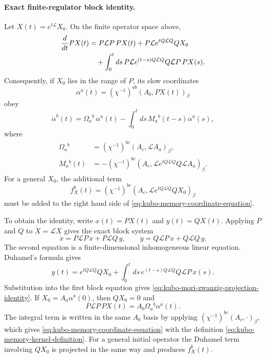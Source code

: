 \paragraph{Exact finite-regulator block identity.}
Let \(X(t)=e^{t\mathcal L}X_0\).  On the finite operator space above,
\begin{align}
  \frac{d}{dt}PX(t)
  &=
  P\mathcal LP\,PX(t)
  +P\mathcal L e^{tQ\mathcal LQ}QX_0
  \notag\\
  &\quad
  +\int_0^t ds\,
  P\mathcal L e^{(t-s)Q\mathcal LQ}
  Q\mathcal LP\,PX(s).
  \label{eq:kubo-mori-zwanzig-projection-identity}
\end{align}
Consequently, if \(X_0\) lies in the range of \(P\), its slow coordinates
\[
  \alpha^a(t)=(\chi^{-1})^{ab}(A_b,PX(t))_\beta
\]
obey
\begin{equation}
  \dot\alpha^b(t)
  =
  \Omega_a{}^b\,\alpha^a(t)
  -\int_0^t ds\,M_a{}^b(t-s)\alpha^a(s),
  \label{eq:kubo-memory-coordinate-equation}
\end{equation}
where
\begin{align}
  \Omega_a{}^b
  &=
  (\chi^{-1})^{bc}(A_c,\mathcal L A_a)_\beta,
  \label{eq:kubo-frequency-matrix}\\
  M_a{}^b(t)
  &=
  -(\chi^{-1})^{bc}
  \left(A_c,
    \mathcal L e^{tQ\mathcal LQ}Q\mathcal L A_a
  \right)_\beta .
  \label{eq:kubo-memory-kernel-definition}
\end{align}
For a general \(X_0\), the additional term
\[
  f_X^b(t)
  =
  (\chi^{-1})^{bc}
  \left(A_c,\mathcal L e^{tQ\mathcal LQ}QX_0\right)_\beta
\]
must be added to the right hand side of
\eqref{eq:kubo-memory-coordinate-equation}.

To obtain the identity, write \(x(t)=PX(t)\) and \(y(t)=QX(t)\).  Applying
\(P\) and \(Q\) to
\(\dot X=\mathcal LX\) gives the exact block system
\[
  \dot x=P\mathcal LP\,x+P\mathcal LQ\,y,
  \qquad
  \dot y=Q\mathcal LP\,x+Q\mathcal LQ\,y .
\]
The second equation is a finite-dimensional inhomogeneous linear equation.
Duhamel's formula gives
\[
  y(t)
  =
  e^{tQ\mathcal LQ}QX_0
  +
  \int_0^t ds\,
  e^{(t-s)Q\mathcal LQ}Q\mathcal LP\,x(s).
\]
Substitution into the first block equation gives
\eqref{eq:kubo-mori-zwanzig-projection-identity}.  If
\(X_0=A_a\alpha^a(0)\), then \(QX_0=0\) and
\[
  P\mathcal LP\,PX(t)
  =
  A_b\Omega_a{}^b\alpha^a(t).
\]
The integral term is written in the same \(A_b\) basis by applying
\((\chi^{-1})^{bc}(A_c,\cdot)_\beta\), which gives
\eqref{eq:kubo-memory-coordinate-equation} with the definition
\eqref{eq:kubo-memory-kernel-definition}.  For a general initial operator the
Duhamel term involving \(QX_0\) is projected in the same way and produces
\(f_X^b(t)\).

